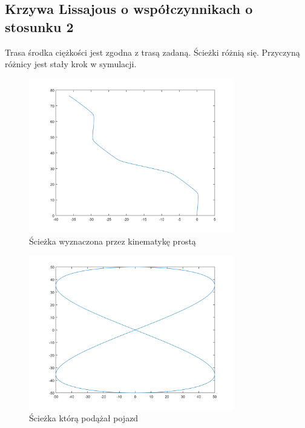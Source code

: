 \documentclass[a4paper, 12pt]{report}
\begin{document}
			\subsection{Krzywa Lissajous o współczynnikach o stosunku 2}
				Trasa środka ciężkości jest zgodna z trasą zadaną. Ścieżki różnią się. Przyczyną różnicy jest stały krok w symulacji.
				\begin{figure}[H]
					\centering
					\includegraphics[width = 0.8\textwidth]{./AP/img/rev/lissajous_2_in_1.png}
					\caption{Ścieżka wyznaczona przez kinematykę prostą}
				\end{figure}
				\begin{figure}[H]
					\centering
					\includegraphics[width = 0.8\textwidth]{./AP/img/rev/lissajous_2_in_2.png}
					\caption{Ścieżka którą podążał pojazd}
				\end{figure}
\end{document}
